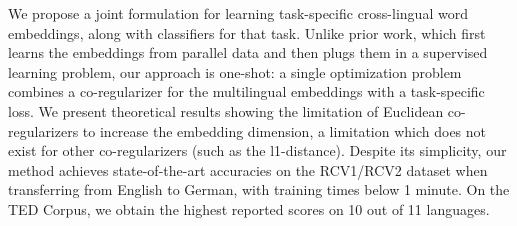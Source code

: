 We propose a joint formulation for learning task-specific cross-lingual word embeddings, along with classifiers for that task. Unlike prior work, which first learns the embeddings from parallel data and then plugs them in a supervised learning problem, our approach is one-shot: a single optimization problem combines a co-regularizer for the multilingual embeddings with a task-specific loss. We present theoretical results showing the limitation of Euclidean co-regularizers to increase the embedding dimension, a limitation which does not exist for other co-regularizers (such as the l1-distance). Despite its simplicity, our method achieves state-of-the-art accuracies on the RCV1/RCV2 dataset when transferring from English to German, with training times below 1 minute. On the TED Corpus, we obtain the highest reported scores on 10 out of 11 languages.
